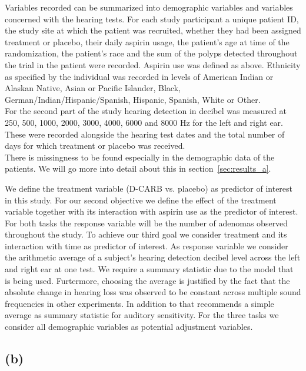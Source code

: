 \documentclass[paper=a4, fontsize=11pt]{scrartcl} %
\numberwithin{equation}{section} %
\numberwithin{figure}{section} %
\numberwithin{table}{section} %
\begin{document}
Variables recorded can be summarized into demographic variables and variables concerned with the hearing tests. For each study participant a unique patient ID, the study site at which the patient was recruited, whether they had been assigned treatment or placebo, their daily aspirin usage, the patient's age at time of the randomization, the patient's race and the sum of the polyps detected throughout the trial in the patient were recorded. Aspirin use was defined as above. Ethnicity as specified by the individual was recorded in levels of American Indian or Alaskan Native, Asian or Pacific Islander, Black, German/Indian/Hispanic/Spanish, Hispanic, Spanish, White or Other.\\
For the second part of the study hearing detection in decibel was measured at 250, 500, 1000, 2000, 3000, 4000, 6000 and 8000 Hz for the left and right ear. These were recorded alongside the hearing test dates and the total number of days for which treatment or placebo was received.\\
There is missingness to be found especially in the demographic data of the patients. We will go more into detail about this in section~\ref{sec:results_a}.

We define the treatment variable (D-CARB vs. placebo) as predictor of interest in this study. For our second objective we define the effect of the treatment variable together with its interaction with aspirin use as the predictor of interest. For both tasks the response variable will be the number of adenomas observed throughout the study. To achieve our third goal we consider treatment and its interaction with time as predictor of interest. As response variable we consider the arithmetic average of a subject's hearing detection decibel level across the left and right ear at one test. We require a summary statistic due to the model that is being used. Furtermore, choosing the average is justified by the fact that the absolute change in hearing loss was observed to be constant across multiple sound frequencies in other experiments. In addition to that \cite{hearing_levels} recommends a simple average as summary statistic for auditory sensitivity. For the three tasks we consider all demographic variables as potential adjustment variables.

\subsection{(b)}
\label{sec:methods_b}
\end{document}
